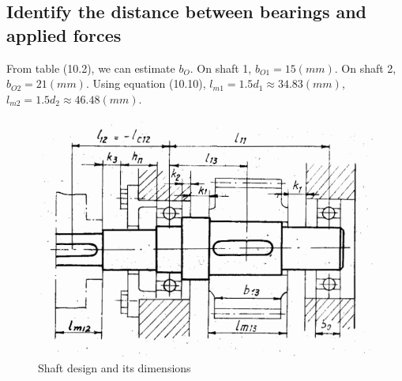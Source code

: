 \subsection{Identify the distance between bearings and applied forces}
From table (10.2), we can estimate $ b_O $. On shaft 1, $ b_{O1} = 15\unit{(mm)} $. On shaft 2, $ b_{O2} = 21\unit{(mm)} $. Using equation (10.10), $ l_{m1} = 1.5d_1 \approx  34.83\unit{(mm)} $, $ l_{m2} = 1.5d_2 \approx 46.48\unit{(mm)} $.
\begin{figure}[ht]
	\centering
	\includegraphics[width=120mm]{shaft1.png}
	\caption{Shaft design and its dimensions}
\end{figure}
